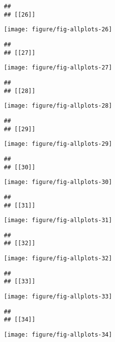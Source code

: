 \documentclass[a4]{article}\usepackage[]{graphicx}\usepackage[]{color}
\makeatletter
\def\maxwidth{ %
  \ifdim\Gin@nat@width>\linewidth
    \linewidth
  \else
    \Gin@nat@width
  \fi
}
\newenvironment{kframe}{%
 \def\at@end@of@kframe{}%
 \ifinner\ifhmode%
  \def\at@end@of@kframe{\end{minipage}}%
  \begin{minipage}{\columnwidth}%
 \fi\fi%
 \def\FrameCommand##1{\hskip\@totalleftmargin \hskip-\fboxsep
 \colorbox{shadecolor}{##1}\hskip-\fboxsep
     \hskip-\linewidth \hskip-\@totalleftmargin \hskip\columnwidth}%
 \MakeFramed {\advance\hsize-\width
   \@totalleftmargin\z@ \linewidth\hsize
   \@setminipage}}%
 {\par\unskip\endMakeFramed%
 \at@end@of@kframe}
\newenvironment{knitrout}{}{} %
\makeatother
\begin{document}
\begin{knitrout}
\begin{kframe}
\begin{verbatim}
## 
## [[26]]
\end{verbatim}
\end{kframe}
\texttt{[image: figure/fig-allplots-26]} 
\begin{kframe}\begin{verbatim}
## 
## [[27]]
\end{verbatim}
\end{kframe}
\texttt{[image: figure/fig-allplots-27]} 
\begin{kframe}\begin{verbatim}
## 
## [[28]]
\end{verbatim}
\end{kframe}
\texttt{[image: figure/fig-allplots-28]} 
\begin{kframe}\begin{verbatim}
## 
## [[29]]
\end{verbatim}
\end{kframe}
\texttt{[image: figure/fig-allplots-29]} 
\begin{kframe}\begin{verbatim}
## 
## [[30]]
\end{verbatim}
\end{kframe}
\texttt{[image: figure/fig-allplots-30]} 
\begin{kframe}\begin{verbatim}
## 
## [[31]]
\end{verbatim}
\end{kframe}
\texttt{[image: figure/fig-allplots-31]} 
\begin{kframe}\begin{verbatim}
## 
## [[32]]
\end{verbatim}
\end{kframe}
\texttt{[image: figure/fig-allplots-32]} 
\begin{kframe}\begin{verbatim}
## 
## [[33]]
\end{verbatim}
\end{kframe}
\texttt{[image: figure/fig-allplots-33]} 
\begin{kframe}\begin{verbatim}
## 
## [[34]]
\end{verbatim}
\end{kframe}
\texttt{[image: figure/fig-allplots-34]} 
\begin{kframe}\begin{verbatim}

\end{verbatim}
\end{kframe}
\end{knitrout}
\end{document}
